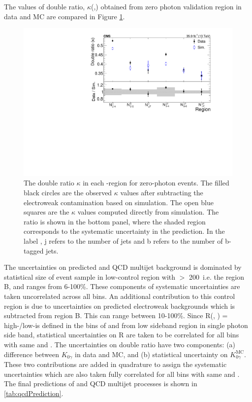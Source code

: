 The values of double ratio, $\kappa$(\nj,\nb) obtained from zero photon validation region in data and MC are compared in Figure \ref{fig:Figure_003}.
\begin{figure}[h!]
\centering
\includegraphics[width=0.8\linewidth]{../Figures/Chap3/anaPublic/Figure_003}
\caption[Double ratio validation]{The double ratio $\kappa$ in each \nj-\nb region for
zero-photon events. The filled black circles are the observed $\kappa$ values after subtracting
the electroweak contamination based on simulation. The open blue squares are the
$\kappa$ values computed directly from simulation.  The ratio is shown in the bottom
panel, where the shaded region corresponds to the systematic uncertainty in the \gjets prediction.
In the label \njb, j refers to the number of jets and b refers to the number of b-tagged jets.}
\label{fig:Figure_003}
\end{figure}

The uncertainties on predicted \gjets and QCD multijet background is dominated by statistical size of event sample in low-\dphi control region with \ptmiss $>$ 200~\gev i.e. the region B, and ranges from 6-100\%. These components of systematic uncertainties are taken uncorrelated across all bins. An additional contribution to this control region is due to uncertainties on predicted electroweak backgrounds which is subtracted from region B. This can range between 10-100\%.  Since R(\nj, \nb) = high-\dphi/low-\dphi is defined in the bins of \nj and \nb from low \ptmiss sideband region in single photon side band, statistical uncertainties on R are taken to be correlated for all bins with same \nj and \nb. The uncertainties on double ratio have two components: (a) difference between $K_{0\gamma}$ in data and MC, and (b) statistical uncertainty on $K_{0\gamma}^{\text{MC}}$. These two contributions are added in quadrature to assign the systematic uncertainties which are also taken fully correlated for all bins with same \nj and \nb.
The final predictions of \gjets and QCD multijet processes is shown in \ref{tab:qcdPrediction}.

